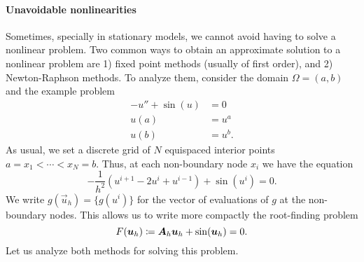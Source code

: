 \paragraph{Unavoidable nonlinearities}
Sometimes, specially in stationary models, we cannot avoid having to solve a nonlinear problem. Two common ways to obtain an approximate solution to a nonlinear problem are 1) fixed point methods (usually of first order), and 2) Newton-Raphson methods. To analyze them, consider the domain $\Omega=(a,b)$ and the example problem
\begin{equation}
    \begin{aligned}
        -u'' + \sin(u) &= 0\\
        u(a) &= u^a\\
        u(b) &= u^b.
    \end{aligned}
\end{equation}
As usual, we set a discrete grid of $N$ equispaced interior points $a=x_1<\cdots<x_N=b$. Thus, at each non-boundary node $x_i$ we have the equation
\begin{equation}
    -\frac{1}{h^2}(u^{i+1}-2u^i+u^{i-1}) + \sin(u^i) = 0.
\end{equation}
We write $g(\vec u_h) = \{g(u^i)\}$ for the vector of evaluations of $g$ at the non-boundary nodes. This allows us to write more compactly the root-finding problem
\begin{equation}
    F(\vec u_h) \coloneqq  \mat A_h \vec u_h + \sin(\vec u_h) = 0.
\end{equation}
Let us analyze both methods for solving this problem.
